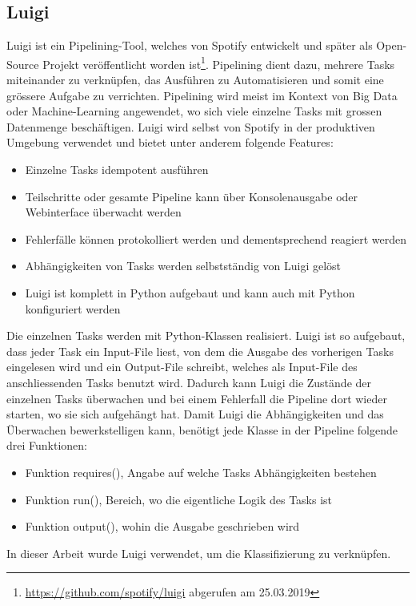 \subsection{Luigi}
Luigi ist ein Pipelining-Tool, welches von Spotify entwickelt und später als Open-Source Projekt veröffentlicht worden ist\footnote{\url{https://github.com/spotify/luigi} abgerufen am 25.03.2019}.
Pipelining dient dazu, mehrere Tasks miteinander zu verknüpfen, das Ausführen zu Automatisieren und somit eine grössere Aufgabe zu verrichten.
Pipelining wird meist im Kontext von Big Data oder Machine-Learning angewendet, wo sich viele einzelne Tasks mit grossen Datenmenge beschäftigen.
Luigi wird selbst von Spotify in der produktiven Umgebung verwendet und bietet unter anderem folgende Features:
\begin{itemize}
	\item Einzelne Tasks idempotent ausführen
	\item Teilschritte oder gesamte Pipeline kann über Konsolenausgabe oder Webinterface überwacht werden
	\item Fehlerfälle können protokolliert werden und dementsprechend reagiert werden
	\item Abhängigkeiten von Tasks werden selbstständig von Luigi gelöst
	\item Luigi ist komplett in Python aufgebaut und kann auch mit Python konfiguriert werden
\end{itemize}
Die einzelnen Tasks werden mit Python-Klassen realisiert.
Luigi ist so aufgebaut, dass jeder Task ein Input-File liest, von dem die Ausgabe des vorherigen Tasks eingelesen wird und ein Output-File schreibt, welches als Input-File des anschliessenden Tasks benutzt wird.
Dadurch kann Luigi die Zustände der einzelnen Tasks überwachen und bei einem Fehlerfall die Pipeline dort wieder starten, wo sie sich aufgehängt hat.
Damit Luigi die Abhängigkeiten und das Überwachen bewerkstelligen kann, benötigt jede Klasse in der Pipeline folgende drei Funktionen:
\begin{itemize}
	\item Funktion requires(), Angabe auf welche Tasks Abhängigkeiten bestehen
	\item Funktion run(), Bereich, wo die eigentliche Logik des Tasks ist
	\item Funktion output(), wohin die Ausgabe geschrieben wird
\end{itemize}
In dieser Arbeit wurde Luigi verwendet, um die Klassifizierung zu verknüpfen.

